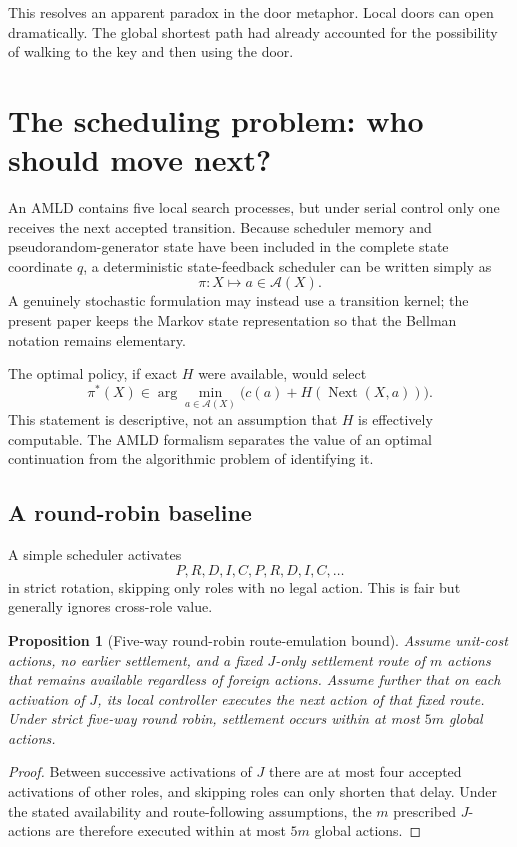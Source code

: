 \documentclass[11pt]{article}
\newtheorem{proposition}[definition]{Proposition}
\theoremstyle{remark}
\newcommand{\Act}{\mathcal A}
\begin{document}
This resolves an apparent paradox in the door metaphor. Local doors can open dramatically. The global shortest path had already accounted for the possibility of walking to the key and then using the door.

\section{The scheduling problem: who should move next?}

An AMLD contains five local search processes, but under serial control only one receives the next accepted transition. Because scheduler memory and pseudorandom-generator state have been included in the complete state coordinate $q$, a deterministic state-feedback scheduler can be written simply as
\[
\pi:X\mapsto a\in\Act(X).
\]
A genuinely stochastic formulation may instead use a transition kernel; the present paper keeps the Markov state representation so that the Bellman notation remains elementary.

The optimal policy, if exact $H$ were available, would select
\[
\pi^*(X)\in\arg\min_{a\in\Act(X)}\bigl(c(a)+H(\operatorname{Next}(X,a))\bigr).
\]
This statement is descriptive, not an assumption that $H$ is effectively computable. The AMLD formalism separates the value of an optimal continuation from the algorithmic problem of identifying it.

\subsection{A round-robin baseline}

A simple scheduler activates
\[
P,R,D,I,C,P,R,D,I,C,\ldots
\]
in strict rotation, skipping only roles with no legal action. This is fair but generally ignores cross-role value.

\begin{proposition}[Five-way round-robin route-emulation bound]
Assume unit-cost actions, no earlier settlement, and a fixed $J$-only settlement route of $m$ actions that remains available regardless of foreign actions. Assume further that on each activation of $J$, its local controller executes the next action of that fixed route. Under strict five-way round robin, settlement occurs within at most $5m$ global actions.
\end{proposition}
\begin{proof}
Between successive activations of $J$ there are at most four accepted activations of other roles, and skipping roles can only shorten that delay. Under the stated availability and route-following assumptions, the $m$ prescribed $J$-actions are therefore executed within at most $5m$ global actions.
\end{proof}
\end{document}
